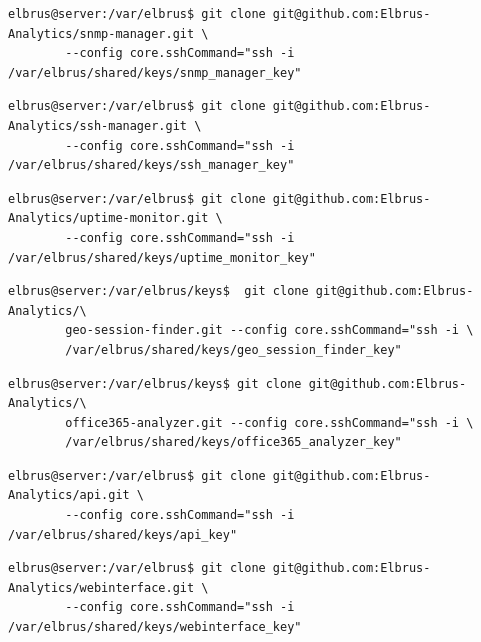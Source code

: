 \documentclass{article}
\begin{document}
	\lstset{style=commands}
	\begin{lstlisting}[caption={Clonen der 'SNMP-Manager' Software.}]
		elbrus@server:/var/elbrus$ git clone git@github.com:Elbrus-Analytics/snmp-manager.git \
		--config core.sshCommand="ssh -i /var/elbrus/shared/keys/snmp_manager_key"
	\end{lstlisting}

	\lstset{style=commands}
	\begin{lstlisting}[caption={Clonen der 'SSH-Manager' Software.}]
		elbrus@server:/var/elbrus$ git clone git@github.com:Elbrus-Analytics/ssh-manager.git \
		--config core.sshCommand="ssh -i /var/elbrus/shared/keys/ssh_manager_key"
	\end{lstlisting}
	
	\lstset{style=commands}
	\begin{lstlisting}[caption={Clonen der 'Uptime-Monitor' Software.}]
		elbrus@server:/var/elbrus$ git clone git@github.com:Elbrus-Analytics/uptime-monitor.git \
		--config core.sshCommand="ssh -i /var/elbrus/shared/keys/uptime_monitor_key"
	\end{lstlisting}

	\lstset{style=commands}
	\begin{lstlisting}[caption={Clonen der 'geo session finders' Software.}]
		elbrus@server:/var/elbrus/keys$  git clone git@github.com:Elbrus-Analytics/\
		geo-session-finder.git --config core.sshCommand="ssh -i \
		/var/elbrus/shared/keys/geo_session_finder_key"
	\end{lstlisting}

	\lstset{style=commands}
	\begin{lstlisting}[caption={Clonen der 'office365-analyzer' Software.}]
		elbrus@server:/var/elbrus/keys$ git clone git@github.com:Elbrus-Analytics/\
		office365-analyzer.git --config core.sshCommand="ssh -i \
		/var/elbrus/shared/keys/office365_analyzer_key"
	\end{lstlisting}
	
	\lstset{style=commands}
	\begin{lstlisting}[caption={Clonen der 'API' Software.}]
		elbrus@server:/var/elbrus$ git clone git@github.com:Elbrus-Analytics/api.git \
		--config core.sshCommand="ssh -i /var/elbrus/shared/keys/api_key"
	\end{lstlisting}

	\lstset{style=commands}
	\begin{lstlisting}[caption={Clonen der 'Webinterface' Software}]
		elbrus@server:/var/elbrus$ git clone git@github.com:Elbrus-Analytics/webinterface.git \
		--config core.sshCommand="ssh -i /var/elbrus/shared/keys/webinterface_key"
	\end{lstlisting}
	\newpage
	
\end{document}
